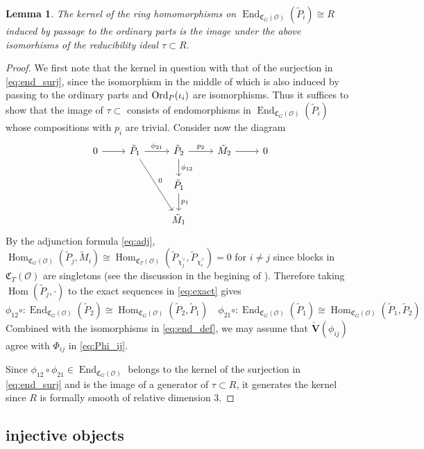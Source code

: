 \documentclass[leqno]{amsart}
\newcommand{\Ord}{\textnormal{Ord}}
\newcommand{\V}{\check{\mathbf{V}}} %
\newcommand{\oo}{\mathcal O}
\newcommand{\1}{\mathbf{1}}
\newcommand{\fC}{\mathfrak C}
\DeclareMathOperator{\End}{End}
\DeclareMathOperator{\Hom}{Hom}
\newtheorem{lem}[thm]{Lemma}
\theoremstyle{definition}
\theoremstyle{remark}
\begin{document}
\begin{lem}\label{lem:ker_ord}
	The kernel of the ring homomorphisms
	on $\End_{\fC_G(\oo)}(\tilde{P}_i)\cong R$
	induced by passage to the ordinary parts
	is the image under the above isomorhisms
	of the reducibility ideal $\tau\subset R$.
\end{lem}
\begin{proof}

We first note that the kernel in question 
with that of the surjection in \eqref{eq:end_surj},
since the isomorphism in the middle of which
is also induced by passing to the ordinary parts
and $\Ord_P(\iota_i)$ are isomorphisms.
Thus it suffices to show that 
the image of $\tau\subset$
consists of endomorphisms  in  $\End_{\fC_G(\oo)}(\tilde{P}_i)$
whose compositions with $p_i$ are trivial.
Consider now the diagram
\[
	\begin{tikzcd}
		0 \arrow[r]&
		\tilde{P}_1  \arrow[r,"\phi_{21}"] \arrow[ddr,"0"] &
		\tilde{P}_2 \arrow[r,"p_2"] \arrow[d,"\phi_{12}"] &
		\tilde{M}_2  \arrow[r] & 0 \\
		 &
		 &
		\tilde{P}_1  \arrow[d,"p_1"] &
		 & \\
				      &  
				      & \tilde{M}_1  & & 
	\end{tikzcd}
\]
By the adjunction formula \eqref{eq:adj}, 
$\Hom_{\fC_G(\oo)}(\tilde{P}_j,\tilde{M}_i)\cong
\Hom_{\fC_T(\oo)}(\tilde{P}_{\chi_j^\vee}, \tilde{P}_{\chi_i^\vee})=0$
for $i\neq j$
since blocks in $\fC_T(\oo)$ are singletons
(see the discussion in the begining of \cite[\S 7.2]{pask}).
Therefore taking $\Hom(\tilde{P}_j,\cdot)$ to the exact sequences in
\eqref{eq:exact} gives
\[
	\phi_{12}\circ\colon
	\End_{\fC_G(\oo)}(\tilde{P}_2)\cong
	\Hom_{\fC_G(\oo)}(\tilde{P}_2, \tilde{P}_1)\quad
	\phi_{21}\circ\colon
	\End_{\fC_G(\oo)}(\tilde{P}_1)\cong
	\Hom_{\fC_G(\oo)}(\tilde{P}_1, \tilde{P}_2)
\]
Combined with the isomorphisms in \eqref{eq:end_def},
we may assume that $\V(\phi_{ij})$ agree with 
$\Phi_{ij}$ in \eqref{eq:Phi_ij}.

Since $\phi_{12}\circ\phi_{21}\in \End_{\fC_G(\oo)}$
belongs to the kernel of the surjection in \eqref{eq:end_surj}
and is the image of a generator 
of $\tau\subset R$,
it generates the kernel 
since  $R$ is formally smooth of relative dimension  $3$.
\end{proof}




\subsection{injective objects}
\end{document}
